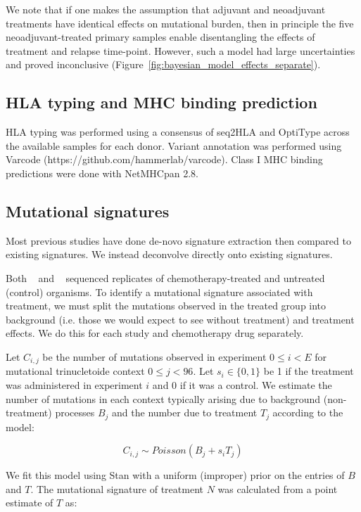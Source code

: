 We note that if one makes the assumption that adjuvant and neoadjuvant treatments have identical effects on mutational burden, then in principle the five neoadjuvant-treated primary samples enable disentangling the effects of treatment and relapse time-point. However, such a model had large uncertainties and proved inconclusive (Figure~\ref{fig:bayesian_model_effects_separate}). 

\subsection*{HLA typing and MHC binding prediction}
HLA typing was performed using a consensus of seq2HLA\cite{Boegel_2012} and OptiType\cite{Szolek_2014} across the available samples for each donor. Variant annotation was performed using Varcode (https://github.com/hammerlab/varcode). Class I MHC binding predictions were done with NetMHCpan 2.8\cite{Lundegaard_2008}.

\subsection*{Mutational signatures}
Most previous studies have done de-novo signature extraction then compared to existing signatures. We instead deconvolve directly onto existing signatures.

Both ~\cite{Meier_2014} and ~\cite{Szikriszt_2016} sequenced replicates of chemotherapy-treated and untreated (control) organisms. To identify a mutational signature associated with treatment, we must split the mutations observed in the treated group into background (i.e. those we would expect to see without treatment) and treatment effects. We do this for each study and chemotherapy drug separately.

Let $C_{i,j}$ be the number of mutations observed in experiment $0 \leq i < E$ for mutational trinucletoide context $0 \leq j < 96$. Let $s_i \in \{0,1\}$ be 1 if the treatment was administered in experiment $i$ and 0 if it was a control. We estimate the number of mutations in each context typically arising due to background (non-treatment) processes $B_j$ and the number due to treatment $T_j$ according to the model:

\[
C_{i,j} \sim \mathit{Poisson}(B_j + s_i T_j)
\]

We fit this model using Stan\cite{Gelman_2015} with a uniform (improper) prior on the entries of $B$ and $T$. The mutational signature of treatment $N$ was calculated from a point estimate of $T$ as:

